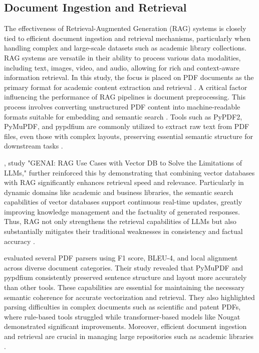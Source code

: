 \begin{refsection}
\subsection{Document Ingestion and Retrieval}

\hspace{1cm}The effectiveness of Retrieval-Augmented Generation (RAG) systems is closely tied to efficient document ingestion and retrieval mechanisms, particularly when handling complex and large-scale datasets such as academic library collections. RAG systems are versatile in their ability to process various data modalities, including text, images, video, and audio, allowing for rich and context-aware information retrieval. In this study, the focus is placed on PDF documents as the primary format for academic content extraction and retrieval \cite{li2023extracting}. A critical factor influencing the performance of RAG pipelines is document preprocessing. This process involves converting unstructured PDF content into machine-readable formats suitable for embedding and semantic search \cite{arzideh2024miracle, aquino2024extracting}. Tools such as PyPDF2, PyMuPDF, and pypdfium are commonly utilized to extract raw text from PDF files, even those with complex layouts, preserving essential semantic structure for downstream tasks \cite{adhikari2024comparative}.

\hspace{0.4cm} \citeauthor{sagi2024genai} \citeyear{sagi2024genai}, study "GENAI: RAG Use Cases with Vector DB to Solve the Limitations of LLMs," further reinforced this by demonstrating that combining vector databases with RAG significantly enhances retrieval speed and relevance. Particularly in dynamic domains like academic and business libraries, the semantic search capabilities of vector databases support continuous real-time updates, greatly improving knowledge management and the factuality of generated responses. Thus, RAG not only strengthens the retrieval capabilities of LLMs but also substantially mitigates their traditional weaknesses in consistency and factual accuracy \cite{sagi2024genai}.

\hspace{0.4cm} \citeauthor{adhikari2024comparative} \citeyear{adhikari2024comparative} evaluated several PDF parsers using F1 score, BLEU-4, and local alignment across diverse document categories. Their study revealed that PyMuPDF and pypdfium consistently preserved sentence structure and layout more accurately than other tools. These capabilities are essential for maintaining the necessary semantic coherence for accurate vectorization and retrieval. They also highlighted parsing difficulties in complex documents such as scientific and patent PDFs, where rule-based tools struggled while transformer-based models like Nougat demonstrated significant improvements. Moreover, efficient document ingestion and retrieval are crucial in managing large repositories such as academic libraries \cite{adhikari2024comparative}.


\end{refsection}

